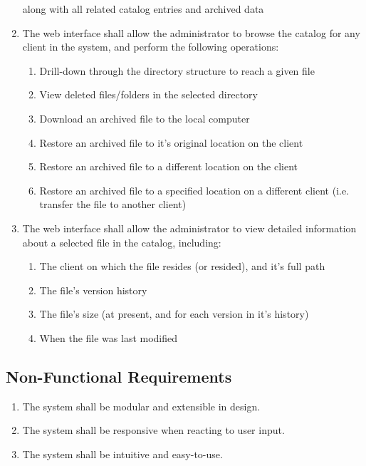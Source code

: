 \begin{enumerate}
        along with all related catalog entries and archived data
    \item The web interface shall allow the administrator to browse the catalog
        for any client in the system, and perform the following operations:
        \begin{enumerate}
            \item Drill-down through the directory structure to reach a given
                file
            \item View deleted files/folders in the selected directory
            \item Download an archived file to the local computer
            \item Restore an archived file to it's original location on the
                client
            \item Restore an archived file to a different location on the
                client
            \item Restore an archived file to a specified location on
                a different client (i.e. transfer the file to another client)
        \end{enumerate}
    \item The web interface shall allow the administrator to view detailed
        information about a selected file in the catalog, including:
        \begin{enumerate}
            \item The client on which the file resides (or resided), and it's
                full path
            \item The file's version history
            \item The file's size (at present, and for each version in it's
                history)
            \item When the file was last modified
        \end{enumerate}
\end{enumerate}

\subsection{Non-Functional Requirements}

\begin{enumerate}
    \item The system shall be modular and extensible in design.
    \item The system shall be responsive when reacting to user input.
    \item The system shall be intuitive and easy-to-use.
\end{enumerate}

